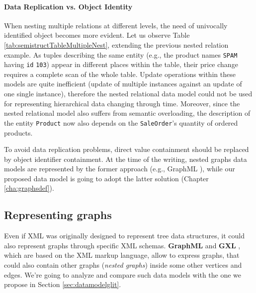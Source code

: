 \paragraph*{Data Replication vs. Object Identity}
When nesting multiple relations at different levels, the need of univocally identified object becomes more evident. Let us observe Table \ref{tab:semistructTableMultipleNest}, extending the previous nested relation example. As  tuples describing the same entity (e.g., the product names \texttt{SPAM} having \texttt{id} \texttt{103}) appear in different places within the table, their price change requires a complete scan of the whole table. Update operations within these models are quite inefficient (update of multiple instances against an update of one single instance), therefore the nested relational data model could not be used for representing hierarchical data changing through time. Moreover, since the nested relational model also suffers from semantic overloading, the description of the entity \texttt{Product} now also depends on the \texttt{SaleOrder}'s quantity of ordered products.

To avoid data replication problems, direct value containment should be replaced by object identifier containment. At the time of the writing, nested graphs data models are represented by the former approach (e.g., GraphML \cite{graphml}), while our proposed data model is going to adopt the latter solution (Chapter \ref{cha:graphsdef}).


\subsection{Representing graphs}
Even if XML was originally designed to represent tree data structures, it could also  represent graphs through specific XML schemas. \textbf{GraphML} \cite{graphml} and \textbf{GXL} \cite{gxlgraphml}, which are based on the XML markup language, allow to express graphs, that could also contain other graphs (\textit{nested graphs}) inside some other vertices and edges. We're going to analyze and compare such data models with the one we propose in Section \vref{sec:datamodelglit}.


